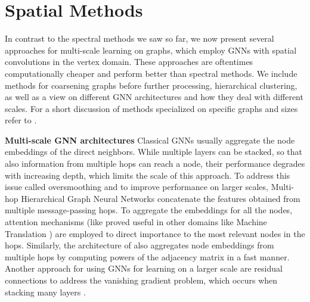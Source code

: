 \documentclass{article}
\begin{document}
\section{Spatial Methods}
\label{sec:SpatialMethods}

In contrast to the spectral methods we saw so far, we now present several approaches for multi-scale learning on graphs, which employ GNNs with spatial convolutions in the vertex domain. These approaches are oftentimes computationally cheaper and perform better than spectral methods.
 We include methods for coarsening graphs before further processing, hierarchical clustering, as well as a view on different GNN architectures and how they deal with different scales. For a short discussion of methods specialized on specific graphs and sizes refer to .



\textbf{Multi-scale GNN architectures}
Classical GNNs usually aggregate the node embeddings of the direct neighbors. While multiple layers can be stacked, so that also information from multiple hops can reach a node, their performance degrades with increasing depth, which limits the scale of this approach. To address this issue called oversmoothing and to improve performance on larger scales, Multi-hop Hierarchical Graph Neural Networks %
\cite{xue2020multi} concatenate the features obtained from multiple message-passing hops. %
To aggregate the embeddings for all the nodes, attention mechanisms (like proved useful in other domains like Machine Translation \cite{vaswani2017attention}) are employed to direct importance to the most relevant nodes in the hops.
Similarly, the architecture of \citet{abuelhaija2019mixhop} also aggregates node embeddings from multiple hops by computing powers of the adjacency matrix in a fast manner. Another approach for using GNNs for learning on a larger scale are residual connections to address the vanishing gradient problem, which occurs when stacking many layers \cite{li2019deepgcns}.
\end{document}
